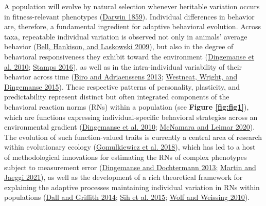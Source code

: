 \documentclass{article}
\begin{document}
A population will evolve by natural selection whenever heritable
variation occurs in fitness-relevant phenotypes
(\protect\hyperlink{ref-Darwin}{Darwin 1859}). Individual differences in
behavior are, therefore, a fundamental ingredient for adaptive
behavioral evolution. Across taxa, repeatable individual variation is
observed not only in animals' average behavior
(\protect\hyperlink{ref-Bell2009}{Bell, Hankison, and Laskowski 2009}),
but also in the degree of behavioral responsiveness they exhibit toward
the environment (\protect\hyperlink{ref-Ding2010}{Dingemanse et al.
2010}; \protect\hyperlink{ref-Stamps2016}{Stamps 2016}), as well as in
the intra-individual variability of their behavior across time
(\protect\hyperlink{ref-Biro2013}{Biro and Adriaenssens 2013};
\protect\hyperlink{ref-Westneat2015}{Westneat, Wright, and Dingemanse
2015}). These respective patterns of personality, plasticity, and
predictability represent distinct but often integrated components of the
behavioral reaction norms (RNs) within a population (see \textbf{Figure
\ref{fig:fig1}}), which are functions expressing individual-specific
behavioral strategies across an environmental gradient
(\protect\hyperlink{ref-Ding2010}{Dingemanse et al. 2010};
\protect\hyperlink{ref-McNamara2020}{McNamara and Leimar 2020}). The
evolution of such function-valued traits is currently a central area of
research within evolutionary ecology
(\protect\hyperlink{ref-Gomulk2018}{Gomulkiewicz et al. 2018}), which
has led to a host of methodological innovations for estimating the RNs
of complex phenotypes subject to measurement error
(\protect\hyperlink{ref-DingDocht2013}{Dingemanse and Dochtermann 2013};
\protect\hyperlink{ref-Martin2021}{Martin and Jaeggi 2021}), as well as
the development of a rich theoretical framework for explaining the
adaptive processes maintaining individual variation in RNs within
populations (\protect\hyperlink{ref-Dall2014}{Dall and Griffith 2014};
\protect\hyperlink{ref-Sih2015}{Sih et al. 2015};
\protect\hyperlink{ref-Wolf2010}{Wolf and Weissing 2010}).
\end{document}
